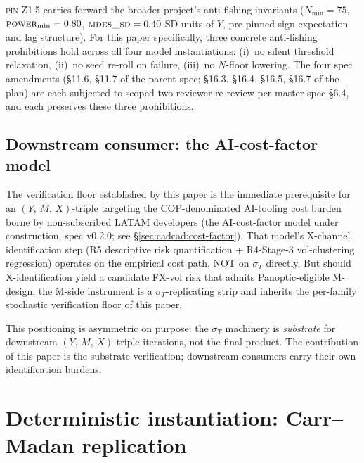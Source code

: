 \documentclass[11pt,letterpaper]{article}
\newcommand{\sigmaT}{\sigma_{T}}
\newcommand{\Ymx}{(Y,\,M,\,X)}
\newcommand{\PinZ}[1]{\textsc{pin Z1.#1}}
\begin{document}
\PinZ{5} carries forward the broader project's anti-fishing invariants
($N_{\min} = 75$, $\textsc{power}_{\min} = 0.80$,
$\textsc{mdes\_sd} = 0.40$ SD-units of $Y$, pre-pinned sign expectation
and lag structure). For this paper specifically, three concrete
anti-fishing prohibitions hold across all four model instantiations:
(i)~no silent threshold relaxation, (ii)~no seed re-roll on failure,
(iii)~no $N$-floor lowering. The four spec amendments
(\S11.6, \S11.7 of the parent spec; \S16.3, \S16.4, \S16.5, \S16.7 of
the plan) are each subjected to scoped two-reviewer re-review per
\textsf{master-spec} \S6.4, and each preserves these three prohibitions.

\subsection{Downstream consumer: the AI-cost-factor model}
\label{sec:framework:downstream}

The verification floor established by this paper is the immediate
prerequisite for an \(\Ymx\)-triple targeting the COP-denominated AI-tooling
cost burden borne by non-subscribed LATAM developers (the AI-cost-factor
model under construction, spec v0.2.0; see
\S\ref{sec:cadcad:cost-factor}). That model's X-channel identification
step (R5 descriptive risk quantification + R4-Stage-3 vol-clustering
regression) operates on the empirical cost path, NOT on $\sigmaT$
directly. But should X-identification yield a candidate FX-vol risk
that admits Panoptic-eligible M-design, the M-side instrument is a
$\sigmaT$-replicating strip and inherits the per-family stochastic
verification floor of this paper.

This positioning is asymmetric on purpose: the $\sigmaT$ machinery is
\emph{substrate} for downstream \(\Ymx\)-triple iterations, not the
final product. The contribution of this paper is the substrate
verification; downstream consumers carry their own identification
burdens.

\section{Deterministic instantiation: Carr--Madan replication}
\label{sec:deterministic}

\end{document}
